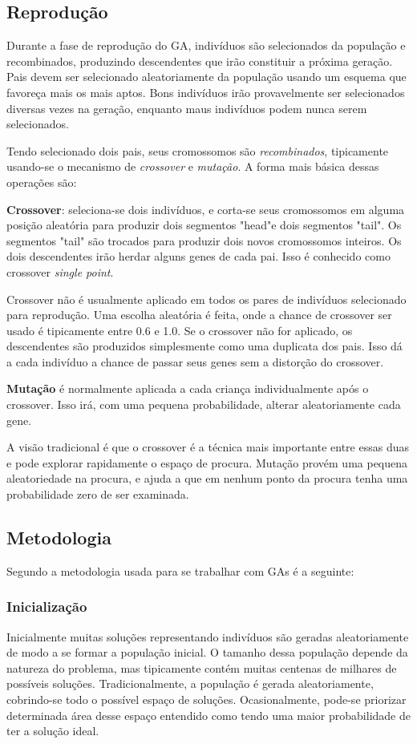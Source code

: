 \subsection{Reprodução}
Durante a fase de reprodução do GA, indivíduos são selecionados da população e recombinados, produzindo descendentes que irão constituir a próxima geração. Pais devem ser selecionado aleatoriamente da população usando um esquema que favoreça mais os mais aptos. Bons indivíduos irão provavelmente ser selecionados diversas vezes na geração, enquanto maus indivíduos podem nunca serem selecionados.

Tendo selecionado dois pais, seus cromossomos são \textit{recombinados}, tipicamente usando-se o mecanismo de \textit{crossover} e \textit{mutação}. A forma mais básica dessas operações são:

\textbf{Crossover}: seleciona-se dois indivíduos, e corta-se seus cromossomos em alguma posição aleatória para produzir dois segmentos "head"e dois segmentos "tail". Os segmentos "tail" são trocados para produzir dois novos cromossomos inteiros. Os dois descendentes irão herdar alguns genes de cada pai. Isso é conhecido como crossover \textit{single point}.

Crossover não é usualmente aplicado em todos os pares de indivíduos selecionado para reprodução. Uma escolha aleatória é feita, onde a chance de crossover ser usado é tipicamente entre 0.6 e 1.0. Se o crossover não for aplicado, os descendentes são produzidos simplesmente como uma duplicata dos pais. Isso dá a cada indivíduo a chance de passar seus genes sem a distorção do crossover. \cite{Beasley1993}

\textbf{Mutação} é normalmente aplicada a cada criança individualmente após o crossover. Isso irá, com uma pequena probabilidade, alterar aleatoriamente cada gene.

A visão tradicional é que o crossover é a técnica mais importante entre essas duas e pode explorar rapidamente o espaço de procura. Mutação provém uma pequena aleatoriedade na procura, e ajuda a que em nenhum ponto da procura tenha uma probabilidade zero de ser examinada. \cite{Beasley1993}

\subsection{Metodologia}

Segundo \cite{Kumar2010} a metodologia usada para se trabalhar com GAs é a seguinte:

\subsubsection{Inicialização}
Inicialmente muitas soluções representando indivíduos são geradas aleatoriamente de modo a se formar a população inicial. O tamanho dessa população depende da natureza do problema, mas tipicamente contém muitas centenas de milhares de possíveis soluções. Tradicionalmente, a população é gerada aleatoriamente, cobrindo-se todo o possível espaço de soluções. Ocasionalmente, pode-se priorizar determinada área desse espaço entendido como tendo uma maior probabilidade de ter a solução ideal.

